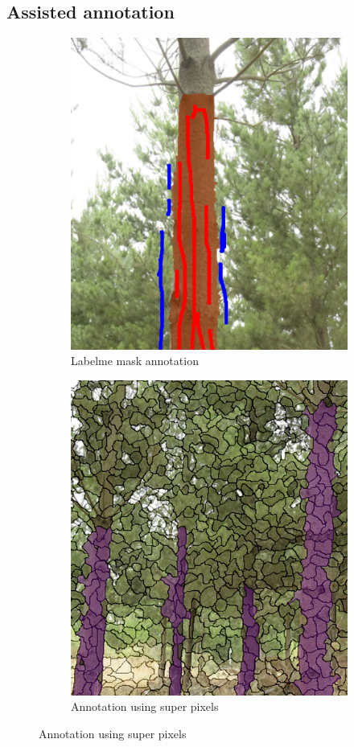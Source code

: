 \documentclass{article}
\begin{document}
\subsection {Assisted annotation}


\begin{figure}[t]
\centering
\begin{subfigure}{.5\textwidth}
  \centering
  \includegraphics[width=0.9\linewidth]{images/labelme.png}
  \caption{Labelme mask annotation}  
  \label{fig:labelme}
\end{subfigure}%
\begin{subfigure}{.5\textwidth}
  \centering
  \includegraphics[width=.9\linewidth]{images/superpixels.png}
  \caption{Annotation using super pixels}
  \label{fig:superpixels}
\end{subfigure}


\end{figure}
\end{document}
